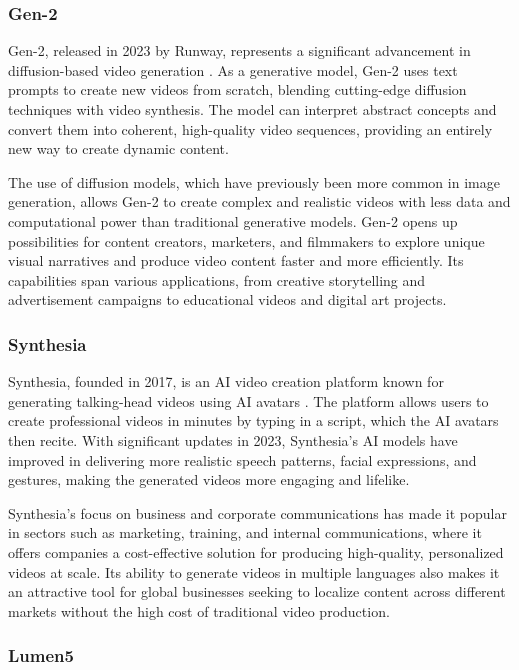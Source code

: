 \subsubsection{Gen-2}

Gen-2, released in 2023 by Runway, represents a significant advancement in diffusion-based video generation \cite{esser2023gen2}. 
As a generative model, Gen-2 uses text prompts to create new videos from scratch, blending cutting-edge diffusion techniques with video synthesis. 
The model can interpret abstract concepts and convert them into coherent, high-quality video sequences, providing an entirely new way to create dynamic content.

The use of diffusion models, which have previously been more common in image generation, allows Gen-2 to create complex and realistic videos with less data and computational power than traditional generative models. 
Gen-2 opens up possibilities for content creators, marketers, and filmmakers to explore unique visual narratives and produce video content faster and more efficiently. 
Its capabilities span various applications, from creative storytelling and advertisement campaigns to educational videos and digital art projects.

\subsubsection{Synthesia}

Synthesia, founded in 2017, is an AI video creation platform known for generating talking-head videos using AI avatars \cite{julia2019use}. 
The platform allows users to create professional videos in minutes by typing in a script, which the AI avatars then recite. 
With significant updates in 2023, Synthesia's AI models have improved in delivering more realistic speech patterns, facial expressions, and gestures, making the generated videos more engaging and lifelike.

Synthesia's focus on business and corporate communications has made it popular in sectors such as marketing, training, and internal communications, where it offers companies a cost-effective solution for producing high-quality, personalized videos at scale. 
Its ability to generate videos in multiple languages also makes it an attractive tool for global businesses seeking to localize content across different markets without the high cost of traditional video production.

\subsubsection{Lumen5}

